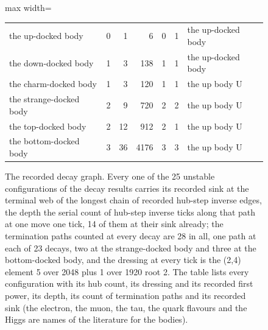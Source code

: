 \begin{figure}[htbp]
{\begin{adjustbox}{max width=\linewidth}
\begin{tabular}{p{44mm}rrrrrp{40mm}}
the up-docked body & 0 & 1 & 6 & 0 & 1 & the up-docked body \\
the down-docked body & 1 & 3 & 138 & 1 & 1 & the up-docked body \\
the charm-docked body & 1 & 3 & 120 & 1 & 1 & the up body U \\
the strange-docked body & 2 & 9 & 720 & 2 & 2 & the up body U \\
the top-docked body & 2 & 12 & 912 & 2 & 1 & the up body U \\
the bottom-docked body & 3 & 36 & 4176 & 3 & 3 & the up body U \\
\end{tabular}\end{adjustbox}}
\caption{The recorded decay graph. Every one of the 25 unstable configurations of the decay results carries its recorded sink at the terminal web of the longest chain of recorded hub-step inverse edges, the depth the serial count of hub-step inverse ticks along that path at one move one tick, 14 of them at their sink already; the termination paths counted at every decay are 28 in all, one path at each of 23 decays, two at the strange-docked body and three at the bottom-docked body, and the dressing at every tick is the (2,4) element 5 over 2048 plus 1 over 1920 root 2. The table lists every configuration with its hub count, its dressing and its recorded first power, its depth, its count of termination paths and its recorded sink (the electron, the muon, the tau, the quark flavours and the Higgs are names of the literature for the bodies).}\label{fig:decay-graph}
\end{figure}
\par\medskip{}\label{narr:close:9-4}\par
